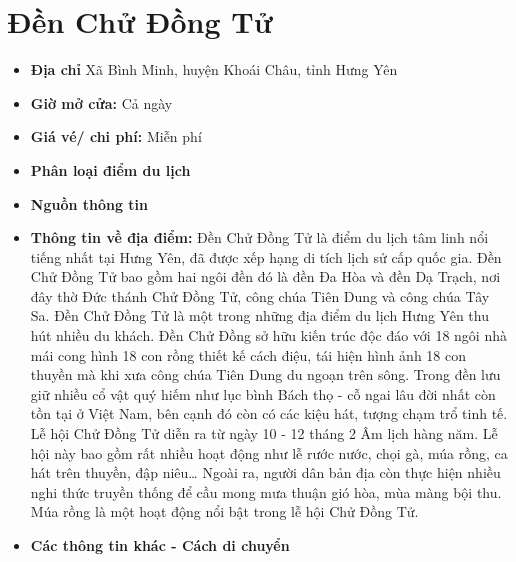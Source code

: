\documentclass{article}
\begin{document}
\section{Đền Chử Đồng Tử}
\begin{itemize}
    \item{\textbf{Địa chỉ}} Xã Bình Minh, huyện Khoái Châu, tỉnh Hưng Yên

    \item{\textbf{Giờ mở cửa:}} Cả ngày

    \item{\textbf{Giá vé/ chi phí:}} Miễn phí

    \item{\textbf{Phân loại điểm du lịch}} 

    \item{\textbf{Nguồn thông tin}} 

    \item{\textbf{Thông tin về địa điểm:}} Đền Chử Đồng Tử là điểm du lịch tâm linh nổi tiếng nhất tại Hưng Yên, đã được xếp hạng di tích lịch sử cấp quốc gia. Đền Chử Đồng Tử bao gồm hai ngôi đền đó là đền Đa Hòa và đền Dạ Trạch, nơi đây thờ Đức thánh Chử Đồng Tử, công chúa Tiên Dung và công chúa Tây Sa. Đền Chử Đồng Tử là một trong những địa điểm du lịch Hưng Yên thu hút nhiều du khách. Đền Chử Đồng sở hữu kiến trúc độc đáo với 18 ngôi nhà mái cong hình 18 con rồng thiết kế cách điệu, tái hiện hình ảnh 18 con thuyền mà khi xưa công chúa Tiên Dung du ngoạn trên sông. Trong đền lưu giữ nhiều cổ vật quý hiếm như lục bình Bách thọ - cỗ ngai lâu đời nhất còn tồn tại ở Việt Nam, bên cạnh đó còn có các kiệu hát, tượng chạm trổ tinh tế. Lễ hội Chử Đồng Tử diễn ra từ ngày 10 - 12 tháng 2 Âm lịch hàng năm. Lễ hội này bao gồm rất nhiều hoạt động như lễ rước nước, chọi gà, múa rồng, ca hát trên thuyền, đập niêu… Ngoài ra, người dân bản địa còn thực hiện nhiều nghi thức truyền thống để cầu mong mưa thuận gió hòa, mùa màng bội thu. Múa rồng là một hoạt động nổi bật trong lễ hội Chử Đồng Tử.
\end{itemize}

\begin{itemize}
    \item{\textbf{Các thông tin khác - Cách di chuyển}} 
\end{itemize}
\end{document}
